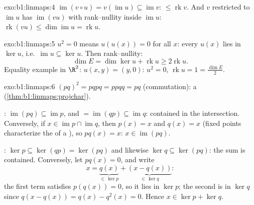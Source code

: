 \begin{solution}{exo:b1:linmaps:4}
$\operatorname{im}(v \circ u) = v(\operatorname{im} u) \subseteq
\operatorname{im} v$:  $\leq \operatorname{rk} v$. And $v$
restricted to $\operatorname{im} u$ has 
$\operatorname{im}(vu)$ with rank--nullity inside
$\operatorname{im} u$: $\operatorname{rk}(vu) \leq
\dim\operatorname{im} u = \operatorname{rk} u$.
\end{solution}

\begin{solution}{exo:b1:linmaps:5}
$u^2 = 0$ means $u(u(x)) = 0$ for all $x$: every $u(x)$ lies in
$\ker u$, i.e.\ $\operatorname{im} u \subseteq \ker u$. Then
rank--nullity:
\[
\dim E = \dim\ker u + \operatorname{rk} u \geq 2\operatorname{rk} u .
\]
Equality example in $\R^2$: $u(x, y) = (y, 0)$: $u^2 = 0$,
$\operatorname{rk} u = 1 = \frac{\dim E}{2}$.
\end{solution}

\begin{solution}{exo:b1:linmaps:6}
$(pq)^2 = pqpq = ppqq = pq$ (commutation): a 
(\cref{thm:b1:linmaps:projchar}).

: $\operatorname{im}(pq) \subseteq \operatorname{im} p$, and
$= \operatorname{im}(qp) \subseteq \operatorname{im} q$: contained
in the intersection. Conversely, if $x \in \operatorname{im} p \cap
\operatorname{im} q$, then $p(x) = x$ and $q(x) = x$ (fixed points
characterize the  of a ), so $pq(x) = x$: $x \in
\operatorname{im}(pq)$.

: $\ker p \subseteq \ker(qp) = \ker(pq)$ and likewise $\ker q
\subseteq \ker(pq)$: the sum is contained. Conversely, let $pq(x) =
0$, and write
\[
x = \underbrace{q(x)}_{\in\, \ker p} +
\underbrace{(x - q(x))}_{\in\, \ker q} :
\]
the first term satisfies $p(q(x)) = 0$, so it lies in $\ker p$; the
second is in $\ker q$ since $q(x - q(x)) = q(x) - q^2(x) = 0$. Hence
$x \in \ker p + \ker q$.
\end{solution}

